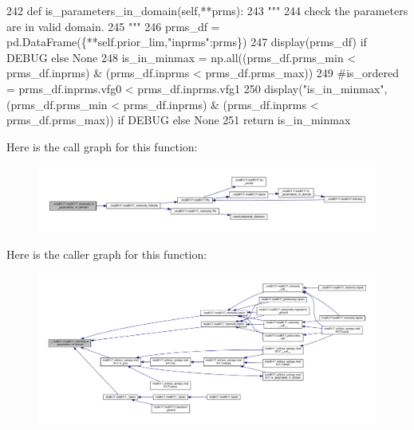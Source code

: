 \begin{DoxyCode}
242     \textcolor{keyword}{def }is\_parameters\_in\_domain(self,**prms):
243         \textcolor{stringliteral}{"""}
244 \textcolor{stringliteral}{        check the parameters are in valid domain.}
245 \textcolor{stringliteral}{        """}
246         prms\_df = pd.DataFrame(\{**self.prior\_lim,\textcolor{stringliteral}{"inprms"}:prms\})
247         display(prms\_df) \textcolor{keywordflow}{if} DEBUG \textcolor{keywordflow}{else} \textcolor{keywordtype}{None}
248         is\_in\_minmax = np.all((prms\_df.prms\_min < prms\_df.inprms) & (prms\_df.inprms < prms\_df.prms\_max))
249         \textcolor{comment}{#is\_ordered = prms\_df.inprms.vfg0 < prms\_df.inprms.vfg1}
250         display(\textcolor{stringliteral}{"is\_in\_minmax"},(prms\_df.prms\_min < prms\_df.inprms) & (prms\_df.inprms < prms\_df.prms\_max)) \textcolor{keywordflow}{
      if} DEBUG \textcolor{keywordflow}{else} \textcolor{keywordtype}{None}
251         \textcolor{keywordflow}{return} is\_in\_minmax
\end{DoxyCode}
Here is the call graph for this function\+:\nopagebreak
\begin{figure}[H]
\begin{center}
\leavevmode
\includegraphics[width=350pt]{d9/d8f/class__modKI17_1_1modKI17__memonly_a7e4159dc246bb2ff5aa958aab45e40d8_cgraph}
\end{center}
\end{figure}
Here is the caller graph for this function\+:\nopagebreak
\begin{figure}[H]
\begin{center}
\leavevmode
\includegraphics[width=350pt]{d9/d8f/class__modKI17_1_1modKI17__memonly_a7e4159dc246bb2ff5aa958aab45e40d8_icgraph}
\end{center}
\end{figure}
\mbox{\label{class__modKI17_1_1modKI17__memonly_a15f3ae6794705cadd3f9a57b954c1fc2}} 
